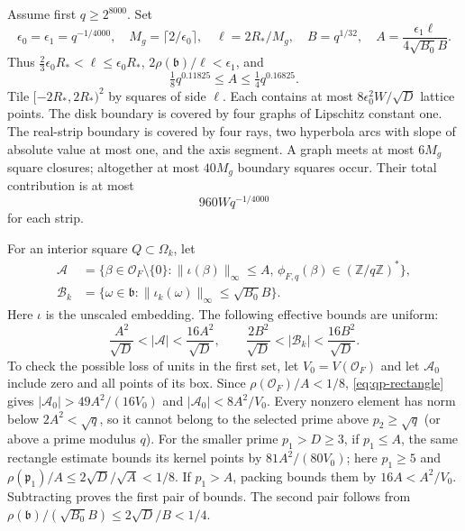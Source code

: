 Assume first $q\geq2^{8000}$.  Set
\[
 \epsilon_0=\epsilon_1=q^{-1/4000},\quad
 M_g=\lceil2/\epsilon_0\rceil,\quad
 \ell=2R_*/M_g,\quad B=q^{1/32},\quad
 A=\frac{\epsilon_1\ell}{4\sqrt{B_0}B}.
\]
Thus $\frac23\epsilon_0R_*<\ell\leq\epsilon_0R_*$,
$2\rho(\mathfrak b)/\ell<\epsilon_1$, and
\begin{equation}
 \tfrac18q^{0.11825}\leq A\leq\tfrac14q^{0.16825}.
 \label{eq:qp-A-range}
\end{equation}
Tile $[-2R_*,2R_*)^2$ by squares of side $\ell$.
Each contains at most $8\epsilon_0^2W/\sqrt D$ lattice points.
The disk boundary is covered by four graphs of Lipschitz constant one.
The real-strip boundary is covered by four rays, two hyperbola arcs
with slope of absolute value at most one, and the axis segment.
A graph meets at most $6M_g$ square closures; altogether at most
$40M_g$ boundary squares occur.  Their total contribution is at most
\begin{equation}
 960Wq^{-1/4000}
 \label{eq:qp-boundary}
\end{equation}
for each strip.

For an interior square $Q\subset\Omega_k$, let
\[
\begin{aligned}
 \mathcal A&=\{\beta\in\mathcal O_F\setminus\{0\}:
       \|\iota(\beta)\|_\infty\leq A,
        \,\phi_{F,q}(\beta)\in(\mathbb Z/q\mathbb Z)^*\},\\
 \mathcal B_k&=\{\omega\in\mathfrak b:
       \|\iota_k(\omega)\|_\infty\leq\sqrt{B_0}B\}.
\end{aligned}
\]
Here $\iota$ is the unscaled embedding.  The following effective bounds
are uniform:
\begin{equation}
 \frac{A^2}{\sqrt D}<|\mathcal A|<\frac{16A^2}{\sqrt D},
 \qquad
 \frac{2B^2}{\sqrt D}<|\mathcal B_k|<\frac{16B^2}{\sqrt D}.
 \label{eq:qp-shift-counts}
\end{equation}
To check the possible loss of units in the first set, let
$V_0=V(\mathcal O_F)$ and let $\mathcal A_0$ include zero and all
points of its box.  Since $\rho(\mathcal O_F)/A<1/8$,
\eqref{eq:qp-rectangle} gives
$|\mathcal A_0|>49A^2/(16V_0)$ and
$|\mathcal A_0|<8A^2/V_0$.
Every nonzero element has norm below $2A^2<\sqrt q$, so it cannot
belong to the selected prime above $p_2\geq\sqrt q$ (or above a prime
modulus $q$).  For the smaller prime $p_1>D\geq3$, if $p_1\leq A$,
the same rectangle estimate bounds its kernel points by
$81A^2/(80V_0)$; here $p_1\geq5$ and
$\rho(\mathfrak p_1)/A\leq2\sqrt D/\sqrt A<1/8$.
If $p_1>A$, packing bounds them by $16A<A^2/V_0$.
Subtracting proves the first pair of bounds.
The second pair follows from
$\rho(\mathfrak b)/(\sqrt{B_0}B)\leq2\sqrt D/B<1/4$.

